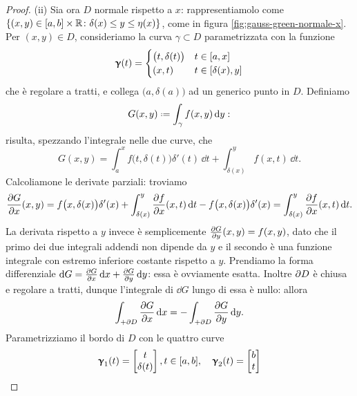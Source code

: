 \begin{proof}
	
	(ii) Sia ora $D$ normale rispetto a $x$: rappresentiamolo come $\{(x,y)\in[a,b]\times\mathbb{R}\colon\delta(x)\leq y\leq\eta(x)\}$, come in figura \ref{fig:gauss-green-normale-x}.
	Per $(x,y)\in D$, consideriamo la curva $\gamma\subset D$ parametrizzata con la funzione
	\begin{equation*}
		\bm{\upgamma}(t)=
		\begin{cases}
			\big(t,\delta(t)\big) &t\in[a,x]\\
			(x,t) &t\in[\delta(x),y]
		\end{cases}
	\end{equation*}
	che è regolare a tratti, e collega $\big(a,\delta(a)\big)$ ad un generico punto in $D$.
	Definiamo
	\begin{equation*}
		G(x,y)\defeq\int_{\gamma}f(x,y)\,\dd y:
	\end{equation*}
	risulta, spezzando l'integrale nelle due curve, che
	\begin{equation}
		G(x,y)=\int_a^xf\big(t,\delta(t)\big)\delta'(t)\,\dd t+\int_{\delta(x)}^yf(x,t)\,\dd t.
	\end{equation}
	Calcoliamone le derivate parziali: troviamo
	\begin{equation}
		\frac{\partial {G}}{\partial {x}}(x,y)=f\big(x,\delta(x)\big)\delta'(x)+\int_{\delta(x)}^y\frac{\partial {f}}{\partial {x}}(x,t)\,\textup{d} t-f\big(x,\delta(x)\big)\delta'(x)=\int_{\delta(x)}^y\frac{\partial {f}}{\partial {x}}(x,t)\,\textup{d} t.
	\end{equation}
	La derivata rispetto a $y$ invece è semplicemente $\frac{\partial {G}}{\partial {y}}(x,y)=f(x,y)$, dato che il primo dei due integrali addendi non dipende da $y$ e il secondo è una funzione integrale con estremo inferiore costante rispetto a $y$.
	Prendiamo la forma differenziale $\textup{d} G=\frac{\partial {G}}{\partial {x}}\,\textup{d} x+\frac{\partial {G}}{\partial {y}}\,\textup{d} y$: essa è ovviamente esatta.
	Inoltre $\partial D$ è chiusa e regolare a tratti, dunque l'integrale di $\dd G$ lungo di essa è nullo: allora
	\begin{equation}
		\int_{+\partial D}\frac{\partial {G}}{\partial {x}}\,\textup{d} x=-\int_{+\partial D}\frac{\partial {G}}{\partial {y}}\,\textup{d} y.
		\label{eq:dim-gauss-green-forma-esatta}
	\end{equation}
	Parametrizziamo il bordo di $D$ con le quattro curve
	\begin{gather*}
		\bm{\upgamma}_1(t)=
		\begin{bmatrix}
			t\\\delta(t)
		\end{bmatrix}, t\in[a,b],\quad
		\bm{\upgamma}_2(t)=
		\begin{bmatrix}
			b\\t

\end{bmatrix}
\end{gather*}
\end{proof}
